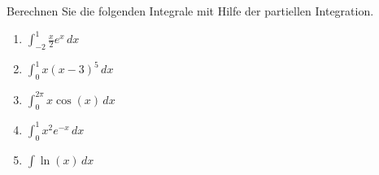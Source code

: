\begin{ExerciseBlock}
Berechnen Sie die folgenden Integrale mit Hilfe der partiellen Integration.
\begin{enumerate}[label=\alph*)]
	\item $\int_{-2}^{1} \frac{x}{2} e^x \, dx$
	\item $\int_{0}^{1} x \left( x-3 \right)^5 \, dx$
	\item $\int_{0}^{2 \pi} x \cos(x) \, dx$
	\item $\int_{0}^{1} x^2 e^{-x} \, dx$
	\item $\int \ln(x) \, dx$
\end{enumerate}

\end{ExerciseBlock}
